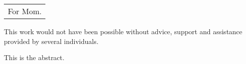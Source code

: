 




\par \noindent
\par \noindent
%
  \begin{dedication}
\begin{minipage}[t]{13cm}
\bc
    \begin{tabular}{c}


        \\[3cm]
        For Mom.

    \end{tabular}
    \ec
\end{minipage}


\end{dedication}

\acknowledgments \par \indent
This work would not have been possible without advice, support and assistance
provided by several individuals.
\endacknowledgments


\tableofcontents

\listoftables

\listoffigures

\begin{abstractpage}
\par \indent
This is the abstract.
\end{abstractpage}


